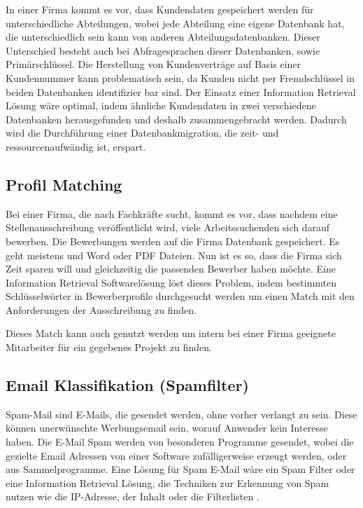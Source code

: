 In einer Firma kommt es vor, dass Kundendaten gespeichert werden für unterschiedliche Abteilungen, wobei jede Abteilung eine eigene Datenbank hat, die unterschiedlich sein kann von anderen Abteilungsdatenbanken. Dieser Unterschied besteht auch bei Abfragesprachen dieser Datenbanken, sowie Primärschlüssel. Die Herstellung von Kundenverträge auf Basis einer Kundennummer kann problematisch sein, da Kunden nicht per Fremdschlüssel in beiden Datenbanken identifizier bar sind. Der Einsatz einer Information Retrieval Lösung wäre optimal, indem ähnliche Kundendaten in zwei verschiedene Datenbanken herausgefunden und deshalb zusammengebracht werden. Dadurch wird die Durchführung einer Datenbankmigration, die zeit- und ressourcenaufwändig ist, erspart.


\subsection{Profil Matching}
\label{subsec:Profilmatching}

Bei einer Firma, die nach Fachkräfte sucht, kommt es vor, dass nachdem eine Stellenausschreibung veröffentlicht wird, viele Arbeitssuchenden sich darauf bewerben. Die Bewerbungen werden auf die Firma Datenbank gespeichert. Es geht meistens und Word oder PDF Dateien. Nun ist es so, dass die Firma sich Zeit sparen will und gleichzeitig die passenden Bewerber haben möchte. Eine Information Retrieval Softwarelösung löst dieses Problem, indem bestimmten Schlüsselwörter in Bewerberprofile durchgesucht werden um einen Match mit den Anforderungen der Ausschreibung zu finden.

Dieses Match kann auch genutzt werden um intern bei einer Firma geeignete Mitarbeiter für ein gegebenes Projekt zu finden.


\subsection{Email Klassifikation (Spamfilter)}
\label{subsec:EmailKlassifikation}

Spam-Mail sind E-Mails, die gesendet werden, ohne vorher verlangt zu sein. Diese können unerwünschte Werbungsemail sein, worauf Anwender kein Interesse haben. Die E-Mail Spam werden von besonderen Programme gesendet, wobei die gezielte Email Adressen von einer Software zufälligerweise erzeugt werden, oder aus Sammelprogramme. Eine Lösung für Spam E-Mail wäre ein Spam Filter oder eine Information Retrieval Lösung, die Techniken zur Erkennung von Spam nutzen wie die IP-Adresse, der Inhalt oder die Filterlisten \cite{COM18}. 

